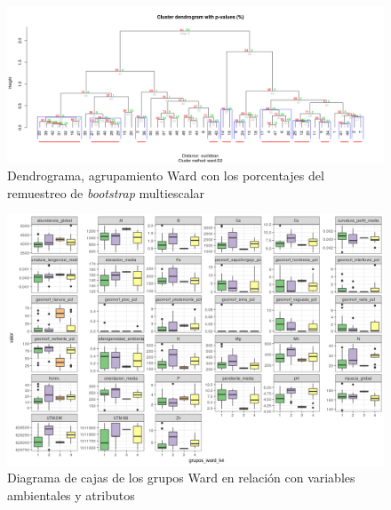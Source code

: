 \documentclass[11pt,]{article}
\begin{document}
\begin{figure}
\centering
\includegraphics{bootstrap_Ward.png}
\caption{Dendrograma, agrupamiento Ward con los porcentajes del
remuestreo de \emph{bootstrap} multiescalar
\label{fig:*bootstrap*_multiescalar}}
\end{figure}

\begin{figure}
\centering
\includegraphics{correlograma_wardyvariablesambientales.png}
\caption{Diagrama de cajas de los grupos Ward en relación con variables
ambientales y atributos \label{fig:ward_con_variables}}
\end{figure}
\end{document}
